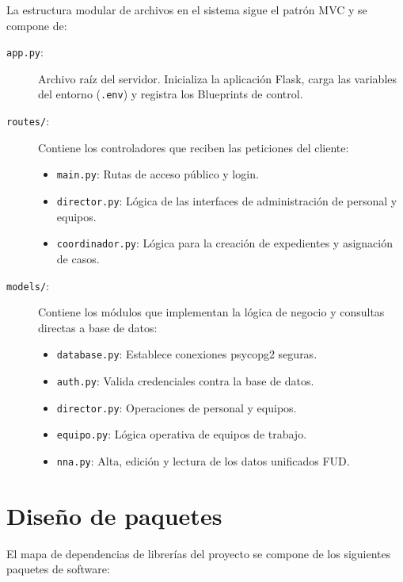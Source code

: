 La estructura modular de archivos en el sistema sigue el patrón MVC y se compone de:

\begin{description}
    \item[\texttt{app.py}:] Archivo raíz del servidor. Inicializa la aplicación Flask, carga las variables del entorno (\texttt{.env}) y registra los Blueprints de control.
    \item[\texttt{routes/}:] Contiene los controladores que reciben las peticiones del cliente:
    \begin{itemize}
        \item \texttt{main.py}: Rutas de acceso público y login.
        \item \texttt{director.py}: Lógica de las interfaces de administración de personal y equipos.
        \item \texttt{coordinador.py}: Lógica para la creación de expedientes y asignación de casos.
    \end{itemize}
    \item[\texttt{models/}:] Contiene los módulos que implementan la lógica de negocio y consultas directas a base de datos:
    \begin{itemize}
        \item \texttt{database.py}: Establece conexiones psycopg2 seguras.
        \item \texttt{auth.py}: Valida credenciales contra la base de datos.
        \item \texttt{director.py}: Operaciones de personal y equipos.
        \item \texttt{equipo.py}: Lógica operativa de equipos de trabajo.
        \item \texttt{nna.py}: Alta, edición y lectura de los datos unificados FUD.
    \end{itemize}
\end{description}

\section{Diseño de paquetes}
\label{sec:disenoPaquetes}

El mapa de dependencias de librerías del proyecto se compone de los siguientes paquetes de software:

